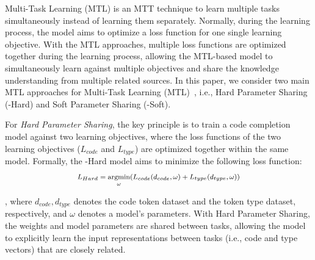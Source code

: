 Multi-Task Learning (MTL) is an MTT technique to learn multiple tasks simultaneously instead of learning them separately.
Normally, during the learning process, the model aims to optimize a loss function for one single learning objective.
With the MTL approaches, multiple loss functions are optimized together during the learning process, allowing the MTL-based model to simultaneously learn against multiple objectives and share the knowledge understanding from multiple related sources.
In this paper, we consider two main MTL approaches for Multi-Task Learning (MTL)~\cite{ruder2017overview}, i.e., Hard Parameter Sharing (\our-Hard) and Soft Parameter Sharing (\our-Soft).

For \emph{Hard Parameter Sharing}, the key principle is to train a code completion model against two learning objectives, where the loss functions of the two learning objectives ($L_{code}$ and $L_{type}$) are optimized together within the same model.
Formally, the \our-Hard model aims to minimize the following loss function: 
\begin{equation}
    \label{eq:1} 
    \begin{aligned}
    \medmath{L_{Hard} = \argmin_{\omega}(L_{code}(d_{code}, \omega) + L_{type}(d_{type}, \omega))}
    \end{aligned}
\end{equation} 

\noindent , where $d_{code}, d_{type}$ denotes the code token dataset and the token type dataset, respectively, and $\omega$ denotes a model's parameters.
With Hard Parameter Sharing, the weights and model parameters are shared between tasks, allowing the model to explicitly learn the input representations between tasks (i.e., code and type vectors) that are closely related.







